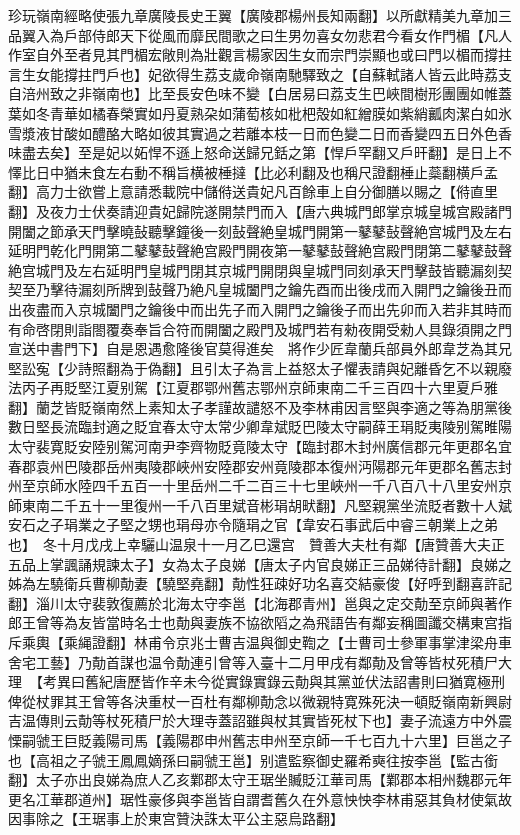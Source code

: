 珍玩嶺南經略使張九章廣陵長史王翼【廣陵郡楊州長知兩翻】以所獻精美九章加三品翼入為戶部侍郎天下從風而靡民間歌之曰生男勿喜女勿悲君今看女作門楣【凡人作室自外至者見其門楣宏敞則為壯觀言楊家因生女而宗門崇顯也或曰門以楣而撐拄言生女能撐拄門戶也】妃欲得生荔支歲命嶺南馳驛致之【自蘇軾諸人皆云此時荔支自涪州致之非嶺南也】比至長安色味不變【白居易曰荔支生巴峽間樹形團團如帷蓋葉如冬青華如橘春榮實如丹夏熟朶如蒲萄核如枇杷殻如紅繒膜如紫綃瓤肉潔白如氷雪漿液甘酸如醴酪大略如彼其實過之若離本枝一日而色變二日而香變四五日外色香味盡去矣】至是妃以妬悍不遜上怒命送歸兄銛之第【悍戶罕翻又戶旰翻】是日上不懌比日中猶未食左右動不稱旨横被棰撻【比必利翻及也稱尺證翻棰止蘂翻横戶孟翻】高力士欲嘗上意請悉載院中儲偫送貴妃凡百餘車上自分御膳以賜之【偫直里翻】及夜力士伏奏請迎貴妃歸院遂開禁門而入【唐六典城門郎掌京城皇城宫殿諸門開闔之節承天門擊曉鼔聽擊鐘後一刻鼔聲絶皇城門開第一鼕鼕鼔聲絶宫城門及左右延明門乾化門開第二鼕鼕鼔聲絶宫殿門開夜第一鼕鼕鼔聲絶宫殿門閉第二鼕鼕鼓聲絶宫城門及左右延明門皇城門閉其京城門開閉與皇城門同刻承天門擊鼓皆聽漏刻契契至乃擊待漏刻所牌到鼔聲乃絶凡皇城闔門之鑰先酉而出後戌而入開門之鑰後丑而出夜盡而入京城闔門之鑰後中而出先子而入開門之鑰後子而出先卯而入若非其時而有命啓閉則詣閤覆奏奉旨合符而開闔之殿門及城門若有勑夜開受勑人具錄須開之門宣送中書門下】自是恩遇愈隆後官莫得進矣　將作少匠韋蘭兵部員外郎韋芝為其兄堅訟寃【少詩照翻為于偽翻】且引太子為言上益怒太子懼表請與妃離昏乞不以親廢法丙子再貶堅江夏别駕【江夏郡鄂州舊志鄂州京師東南二千三百四十六里夏戶雅翻】蘭芝皆貶嶺南然上素知太子孝謹故譴怒不及李林甫因言堅與李適之等為朋黨後數日堅長流臨封適之貶宜春太守太常少卿韋斌貶巴陵太守嗣薛王琄貶夷陵别駕睢陽太守裴寛貶安陸别駕河南尹李齊物貶竟陵太守【臨封郡木封州廣信郡元年更郡名宜春郡袁州巴陵郡岳州夷陵郡峽州安陸郡安州竟陵郡本復州沔陽郡元年更郡名舊志封州至京師水陸四千五百一十里岳州二千二百三十七里峽州一千八百八十八里安州京師東南二千五十一里復州一千八百里斌音彬琄胡畎翻】凡堅親黨坐流貶者數十人斌安石之子琄業之子堅之甥也琄母亦令隨琄之官【韋安石事武后中睿三朝業上之弟也】　冬十月戊戌上幸驪山温泉十一月乙巳還宫　贊善大夫杜有鄰【唐贊善大夫正五品上掌諷誦規諫太子】女為太子良娣【唐太子内官良娣正三品娣待計翻】良娣之姊為左驍衛兵曹柳勣妻【驍堅堯翻】勣性狂疎好功名喜交結豪俊【好呼到翻喜許記翻】淄川太守裴敦復薦於北海太守李邕【北海郡青州】邕與之定交勣至京師與著作郎王曾等為友皆當時名士也勣與妻族不協欲䧟之為飛語告有鄰妄稱圖讖交構東宫指斥乘輿【乘䋲證翻】林甫令京兆士曹吉温與御史鞫之【士曹司士參軍事掌津梁舟車舍宅工藝】乃勣首謀也温令勣連引曾等入臺十二月甲戌有鄰勣及曾等皆杖死積尸大理　【考異曰舊紀唐歷皆作辛未今從實錄實錄云勣與其黨並伏法詔書則曰猶寛極刑俾從杖罪其王曾等各決重杖一百杜有鄰柳勣念以微親特寛殊死決一頓貶嶺南新興尉吉温傳則云勣等杖死積尸於大理寺蓋詔雖與杖其實皆死杖下也】妻子流遠方中外震慄嗣虢王巨貶義陽司馬【義陽郡申州舊志申州至京師一千七百九十六里】巨邕之子也【高祖之子虢王鳳鳳嫡孫曰嗣虢王邕】别遣監察御史羅希奭往按李邕【監古銜翻】太子亦出良娣為庶人乙亥鄴郡太守王琚坐贓貶江華司馬【鄴郡本相州魏郡元年更名冮華郡道州】琚性豪侈與李邕皆自謂耆舊久在外意怏怏李林甫惡其負材使氣故因事除之【王琚事上於東宫贊決誅太平公主惡烏路翻】

